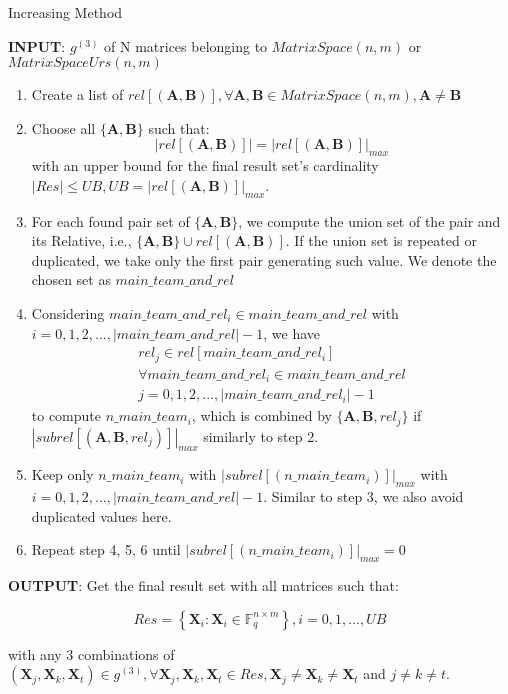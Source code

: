 \begin{algorithm}[H]
\caption{Increasing Method \label{alg:Increasing-Method}}

\textbf{INPUT}: $g^{\left(3\right)}$ of N matrices belonging to $MatrixSpace(n,m)$
or $MatrixSpaceUrs(n,m)$
\begin{enumerate}
\item Create a list of $rel\left[\left(\boldsymbol{A},\boldsymbol{B}\right)\right],\forall\boldsymbol{A},\boldsymbol{B}\in MatrixSpace(n,m),\boldsymbol{A}\neq\boldsymbol{B}$
\item Choose all $\{\boldsymbol{A},\boldsymbol{B}\}$ such that:
\[
\left|rel\left[\left(\boldsymbol{A},\boldsymbol{B}\right)\right]\right|=\left|rel\left[\left(\boldsymbol{A},\boldsymbol{B}\right)\right]\right|_{max}
\]
with an upper bound for the final result set's cardinality $\left|Res\right|\leq UB,UB=\left|rel\left[\left(\boldsymbol{A},\boldsymbol{B}\right)\right]\right|_{max}$.
\item For each found pair set of $\{\boldsymbol{A},\boldsymbol{B}\}$, we
compute the union set of the pair and its Relative, i.e., $\{\boldsymbol{A},\boldsymbol{B}\}\cup rel\left[\left(\boldsymbol{A},\boldsymbol{B}\right)\right]$.
If the union set is repeated or duplicated, we take only the first
pair generating such value. We denote the chosen set as $main\_team\_and\_rel$
\item Considering $main\_team\_and\_rel_{i}\in main\_team\_and\_rel$ with
$i=0,1,2,...,\left|main\_team\_and\_rel\right|-1$, we have 
\[
\begin{array}{c}
rel_{j}\in rel\left[main\_team\_and\_rel_{i}\right]\\
\forall main\_team\_and\_rel_{i}\in main\_team\_and\_rel\\
j=0,1,2,...,\left|main\_team\_and\_rel_{i}\right|-1
\end{array}
\]
to compute $n\_main\_team_{i}$, which is combined by $\{\boldsymbol{A},\boldsymbol{B},rel_{j}\}$
if $\left|subrel\left[\left(\boldsymbol{A},\boldsymbol{B},rel_{j}\right)\right]\right|_{max}$
similarly to step 2.
\item Keep only $n\_main\_team_{i}$ with $\left|subrel\left[\left(n\_main\_team_{i}\right)\right]\right|_{max}$
with $i=0,1,2,...,\left|main\_team\_and\_rel\right|-1$. Similar to
step 3, we also avoid duplicated values here.
\item Repeat step 4, 5, 6 until $\left|subrel\left[\left(n\_main\_team_{i}\right)\right]\right|_{max}=0$
\end{enumerate}
\textbf{OUTPUT}: Get the final result set with all matrices such that:

\[
Res=\left\{ \boldsymbol{X}_{i}:\boldsymbol{X}_{i}\in\ensuremath{\mathbb{F}}_{q}^{n\times m}\right\} ,i=0,1,...,UB
\]

with any 3 combinations of $\left(\boldsymbol{X}_{j},\boldsymbol{X}_{k},\boldsymbol{X}_{t}\right)\in g^{\left(3\right)},\forall\boldsymbol{X}_{j},\boldsymbol{X}_{k},\boldsymbol{X}_{t}\in Res,\boldsymbol{X}_{j}\neq\boldsymbol{X}_{k}\neq\boldsymbol{X}_{t}$
and $j\neq k\neq t$.
\end{algorithm}

